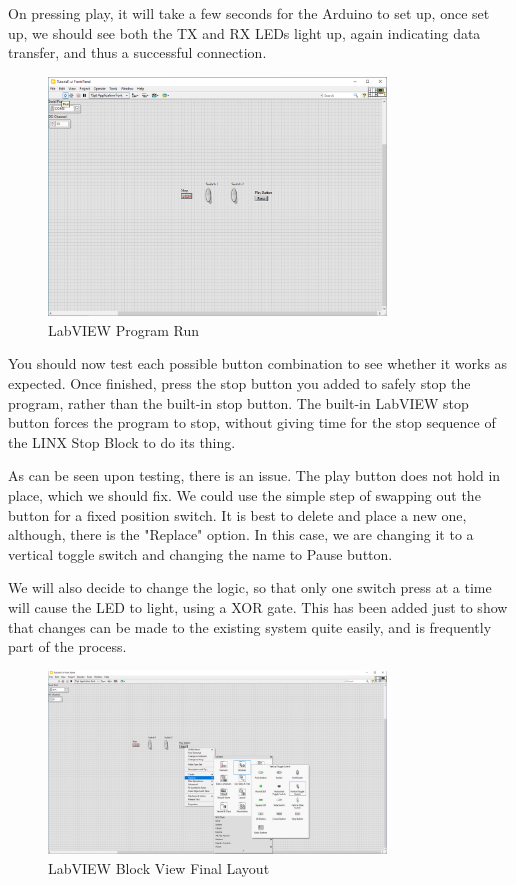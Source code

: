 \documentclass[a4paper,11pt]{report}
\begin{document}
On pressing play, it will take a few seconds for the Arduino to set up, once set up, we should see both the TX and RX LEDs light up, again indicating data transfer, and thus a successful connection.

\begin{figure}[H]
\centering
\includegraphics[width=0.8\textwidth]{screenshots/labview30}
\caption{LabVIEW Program Run}
\end{figure}

You should now test each possible button combination to see whether it works as expected. Once finished, press the stop button you added to safely stop the program, rather than the built-in stop button. The built-in LabVIEW stop button forces the program to stop, without giving time for the stop sequence of the LINX Stop Block to do its thing.

As can be seen upon testing, there is an issue. The play button does not hold in place, which we should fix. We could use the simple step of swapping out the button for a fixed position switch. It is best to delete and place a new one, although, there is the "Replace" option. In this case, we are changing it to a vertical toggle switch and changing the name to Pause button.

We will also decide to change the logic, so that only one switch press at a time will cause the LED to light, using a XOR gate. This has been added just to show that changes can be made to the existing system quite easily, and is frequently part of the process.

\begin{figure}[H]
\centering
\includegraphics[width=0.8\textwidth]{screenshots/labview31}
\caption{LabVIEW Block View Final Layout}
\end{figure}
\end{document}
